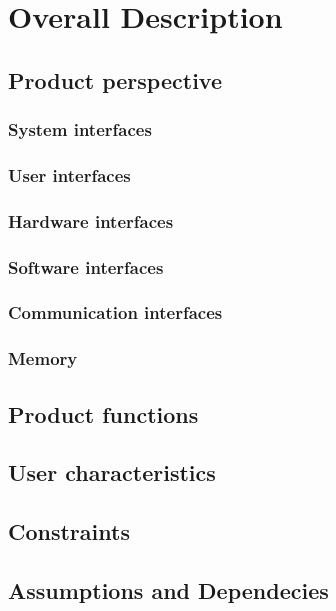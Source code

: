 \section{Overall Description}
\subsection{Product perspective}
\subsubsection{System interfaces}
\subsubsection{User interfaces}
\subsubsection{Hardware interfaces}
% 
\subsubsection{Software interfaces}
\subsubsection{Communication interfaces}
\subsubsection{Memory}

\subsection{Product functions}
\subsection{User characteristics}
\subsection{Constraints}
\subsection{Assumptions and Dependecies}



